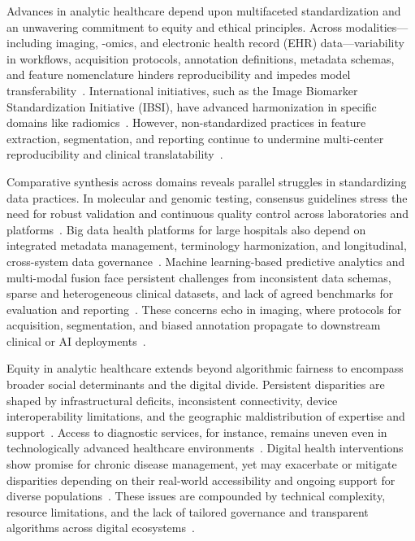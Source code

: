 \documentclass[sigconf]{acmart}
\begin{document}
Advances in analytic healthcare depend upon multifaceted standardization and an unwavering commitment to equity and ethical principles. Across modalities—including imaging, -omics, and electronic health record (EHR) data—variability in workflows, acquisition protocols, annotation definitions, metadata schemas, and feature nomenclature hinders reproducibility and impedes model transferability~\cite{ref44,ref45,ref46,ref50,ref54,ref55,ref60,ref61,ref62,ref63,ref64,ref65,ref74,ref75,ref78,ref5,ref53,ref66,ref67,ref71,ref72,ref76,ref79,ref80,ref84,ref90,ref106}. International initiatives, such as the Image Biomarker Standardization Initiative (IBSI), have advanced harmonization in specific domains like radiomics~\cite{ref44}. However, non-standardized practices in feature extraction, segmentation, and reporting continue to undermine multi-center reproducibility and clinical translatability~\cite{ref45,ref46,ref54,ref55,ref65,ref74,ref75,ref78,ref90,ref106}.

Comparative synthesis across domains reveals parallel struggles in standardizing data practices. In molecular and genomic testing, consensus guidelines stress the need for robust validation and continuous quality control across laboratories and platforms~\cite{ref60,ref61}. Big data health platforms for large hospitals also depend on integrated metadata management, terminology harmonization, and longitudinal, cross-system data governance~\cite{ref84}. Machine learning-based predictive analytics and multi-modal fusion face persistent challenges from inconsistent data schemas, sparse and heterogeneous clinical datasets, and lack of agreed benchmarks for evaluation and reporting~\cite{ref54,ref78,ref90,ref106}. These concerns echo in imaging, where protocols for acquisition, segmentation, and biased annotation propagate to downstream clinical or AI deployments~\cite{ref44,ref45,ref46,ref50,ref53,ref66,ref67}.

Equity in analytic healthcare extends beyond algorithmic fairness to encompass broader social determinants and the digital divide. Persistent disparities are shaped by infrastructural deficits, inconsistent connectivity, device interoperability limitations, and the geographic maldistribution of expertise and support~\cite{ref61,ref63,ref65,ref69,ref78,ref79,ref82,ref84,ref85,ref90,ref106}. Access to diagnostic services, for instance, remains uneven even in technologically advanced healthcare environments~\cite{ref63,ref82}. Digital health interventions show promise for chronic disease management, yet may exacerbate or mitigate disparities depending on their real-world accessibility and ongoing support for diverse populations~\cite{ref79,ref82,ref84,ref90,ref106}. These issues are compounded by technical complexity, resource limitations, and the lack of tailored governance and transparent algorithms across digital ecosystems~\cite{ref82,ref84}.
\end{document}
